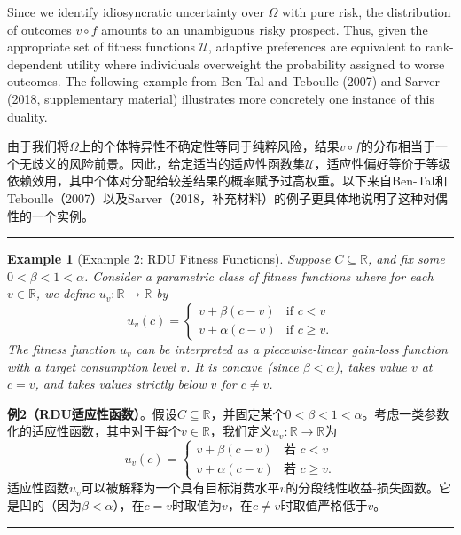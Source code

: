 \documentclass[12pt,a4paper]{article}
\newenvironment{original}
  {\par\noindent\color{black}\smallskip}
  {\par\smallskip}
\newenvironment{translation}
  {\par\noindent\color{blue!70!black}\smallskip}
  {\par\medskip\hrule\medskip}
\newtheorem{example}[theorem]{Example}
\begin{document}
\begin{original}
Since we identify idiosyncratic uncertainty over $\Omega$ with pure risk, the distribution of outcomes $v \circ f$ amounts to an unambiguous risky prospect. Thus, given the appropriate set of fitness functions $\mathcal{U}$, adaptive preferences are equivalent to rank-dependent utility where individuals overweight the probability assigned to worse outcomes. The following example from Ben-Tal and Teboulle (2007) and Sarver (2018, supplementary material) illustrates more concretely one instance of this duality.
\end{original}
\begin{translation}
由于我们将$\Omega$上的个体特异性不确定性等同于纯粹风险，结果$v \circ f$的分布相当于一个无歧义的风险前景。因此，给定适当的适应性函数集$\mathcal{U}$，适应性偏好等价于等级依赖效用，其中个体对分配给较差结果的概率赋予过高权重。以下来自Ben-Tal和Teboulle（2007）以及Sarver（2018，补充材料）的例子更具体地说明了这种对偶性的一个实例。
\end{translation}

\begin{example}[Example 2: RDU Fitness Functions]
Suppose $C \subseteq \mathbb{R}$, and fix some $0 < \beta < 1 < \alpha$. Consider a parametric class of fitness functions where for each $v \in \mathbb{R}$, we define $u_v: \mathbb{R} \to \mathbb{R}$ by
\[
u_v(c) = \begin{cases}
v + \beta(c - v) & \text{if } c < v \\
v + \alpha(c - v) & \text{if } c \geq v.
\end{cases}
\]
The fitness function $u_v$ can be interpreted as a piecewise-linear gain-loss function with a target consumption level $v$. It is concave (since $\beta < \alpha$), takes value $v$ at $c = v$, and takes values strictly below $v$ for $c \neq v$.
\end{example}
\begin{translation}
\textbf{例2（RDU适应性函数）}。假设$C \subseteq \mathbb{R}$，并固定某个$0 < \beta < 1 < \alpha$。考虑一类参数化的适应性函数，其中对于每个$v \in \mathbb{R}$，我们定义$u_v: \mathbb{R} \to \mathbb{R}$为
\[
u_v(c) = \begin{cases}
v + \beta(c - v) & \text{若 } c < v \\
v + \alpha(c - v) & \text{若 } c \geq v.
\end{cases}
\]
适应性函数$u_v$可以被解释为一个具有目标消费水平$v$的分段线性收益-损失函数。它是凹的（因为$\beta < \alpha$），在$c = v$时取值为$v$，在$c \neq v$时取值严格低于$v$。
\end{translation}
\end{document}
